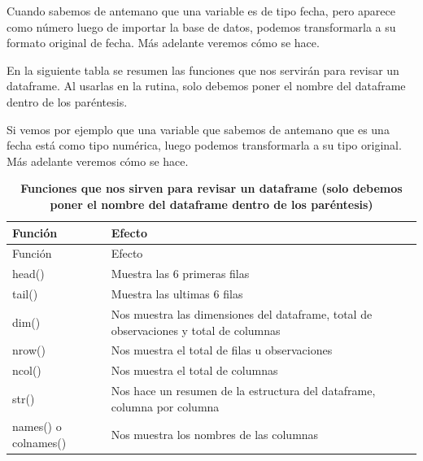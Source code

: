 \documentclass[
  letterpaper,
  DIV=11,
  numbers=noendperiod]{scrreprt}
\begin{document}
Cuando sabemos de antemano que una variable es de tipo fecha, pero
aparece como número luego de importar la base de datos, podemos
transformarla a su formato original de fecha. Más adelante veremos cómo
se hace.

En la siguiente tabla se resumen las funciones que nos servirán para
revisar un dataframe. Al usarlas en la rutina, solo debemos poner el
nombre del dataframe dentro de los paréntesis.

Si vemos por ejemplo que una variable que sabemos de antemano que es una
fecha está como tipo numérica, luego podemos transformarla a su tipo
original. Más adelante veremos cómo se hace.

\begin{longtable}[]{@{}
  >{\raggedright\arraybackslash}p{}
  >{\raggedright\arraybackslash}p{}@{}}
\caption{\textbf{Funciones que nos sirven para revisar un dataframe
(solo debemos poner el nombre del dataframe dentro de los
paréntesis)}}\tabularnewline
\toprule\noalign{}
\begin{minipage}[b]{\linewidth}\raggedright
Función
\end{minipage} & \begin{minipage}[b]{\linewidth}\raggedright
Efecto
\end{minipage} \\
\midrule\noalign{}
\endfirsthead
\toprule\noalign{}
\begin{minipage}[b]{\linewidth}\raggedright
Función
\end{minipage} & \begin{minipage}[b]{\linewidth}\raggedright
Efecto
\end{minipage} \\
\midrule\noalign{}
\endhead
\bottomrule\noalign{}
\endlastfoot
head() & Muestra las 6 primeras filas \\
tail() & Muestra las ultimas 6 filas \\
dim() & Nos muestra las dimensiones del dataframe, total de
observaciones y total de columnas \\
nrow() & Nos muestra el total de filas u observaciones \\
ncol() & Nos muestra el total de columnas \\
str() & Nos hace un resumen de la estructura del dataframe, columna por
columna \\
names() o colnames() & Nos muestra los nombres de las columnas \\
\end{longtable}
\end{document}
